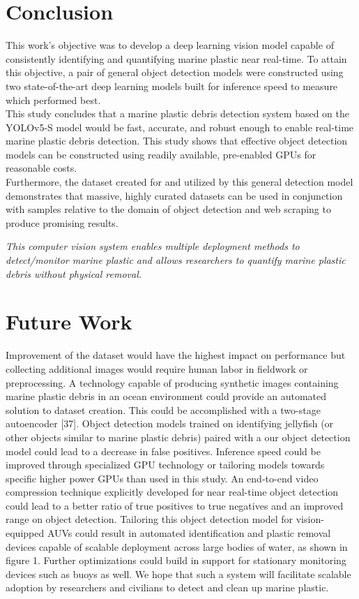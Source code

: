 \documentclass[a4paper,fleqn]{cas-dc}
\begin{document}
\section{Conclusion}
\label{sec:con}
This work’s objective was to develop a deep learning vision model capable of consistently identifying and quantifying marine plastic near real-time. To attain this objective, a pair of general object detection models were constructed using two state-of-the-art deep learning models built for inference speed to measure which performed best.
\\
\indent
This study concludes that a marine plastic debris detection system based on the YOLOv5-S model would be fast, accurate, and robust enough to enable real-time marine plastic debris detection.
This study shows that effective object detection models can be constructed using readily available, pre-enabled GPUs for reasonable costs.
\\
\indent
Furthermore, the dataset created for and utilized by this general detection model demonstrates that massive, highly curated datasets can be used in conjunction with samples relative to the domain of object detection and web scraping to produce promising results. 

\textit{This computer vision system enables multiple deployment methods to detect/monitor marine plastic and allows researchers to quantify marine plastic debris without physical removal.}


\section{Future Work}
Improvement of the dataset would have the highest impact on performance but collecting additional images would require human labor in fieldwork or preprocessing. A technology capable of producing synthetic images containing marine plastic debris in an ocean environment could provide an automated solution to dataset creation. This could be accomplished with a two-stage autoencoder [37]. Object detection models trained on identifying jellyfish (or other objects similar to marine plastic debris) paired with a our object detection model could lead to a decrease in false positives.
Inference speed could be improved through specialized GPU technology or tailoring models towards specific higher power GPUs than used in this study.
An end-to-end video compression technique explicitly developed for near real-time object detection could lead to a better ratio of true positives to true negatives and an improved range on object detection.
Tailoring this object detection model for vision-equipped AUVs could result in automated identification and plastic removal devices capable of scalable deployment across large bodies of water, as shown in figure 1. Further optimizations could build in support for stationary monitoring devices such as buoys as well. We hope that such a system will facilitate scalable adoption by researchers and civilians to detect and clean up marine plastic.
\end{document}
